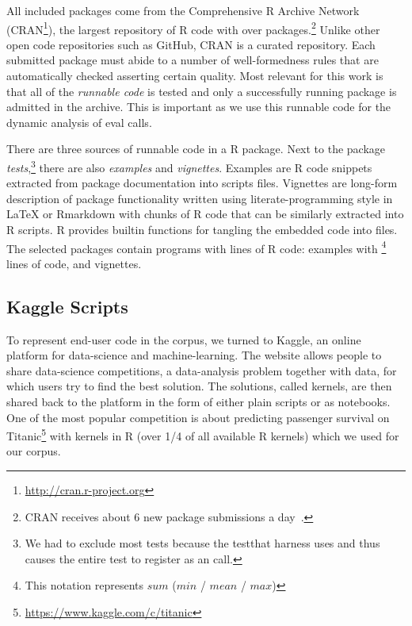 \documentclass[conference]{IEEEtran}
\begin{document}
All included packages come from the Comprehensive R Archive Network
(CRAN\footnote{\url{http://cran.r-project.org}}), the largest repository of R
code with over \CorpusAllCranRnd packages.\footnote{CRAN receives about 6 new
  package submissions a day~\cite{Ligges2017}.} Unlike other open code
repositories such as GitHub, CRAN is a curated repository. Each submitted
package must abide to a number of well-formedness rules that are automatically
checked asserting certain quality. Most relevant for this work is that all of
the \emph{runnable code} is tested and only a successfully running package is
admitted in the archive. This is important as we use this runnable code for the
dynamic analysis of eval calls.

There are three sources of runnable code in a R package. Next to the package
\emph{tests},\footnote{We had to exclude most tests because the {testthat}
  harness uses \eval and thus causes the entire test to register as an \eval
  call.} there are also \emph{examples} and \emph{vignettes}. Examples are R
code snippets extracted from package documentation into scripts files.
Vignettes are long-form description of package functionality written using
literate-programming style in \LaTeX\xspace or Rmarkdown with chunks of R
code that can be similarly extracted into R scripts. R provides builtin
functions for tangling the embedded code into files.  The selected packages
contain \CorpusPackagePrograms programs with \CorpusPackageProgramsCodeRnd
lines of R code: \CorpusExamplesProgramsRnd examples with
\footnote{This notation represents $sum$
  ($min$ / $mean$ / $max$)} lines of code, and \CorpusVignettesProgramsRnd
vignettes.%

\subsection{Kaggle Scripts}

To represent end-user code in the corpus, we turned to Kaggle, an online
platform for data-science and machine-learning. The website allows people to
share data-science competitions, a data-analysis problem together with data,
for which users try to find the best solution. The solutions, called
{kernels}, are then shared back to the platform in the form of either plain
scripts or as notebooks.  One of the most popular competition is about
predicting passenger survival on
Titanic\footnote{\url{https://www.kaggle.com/c/titanic}} with \CorpusKaggle
kernels in R (over 1/4 of all available R kernels) which we used for our
corpus.
\end{document}
